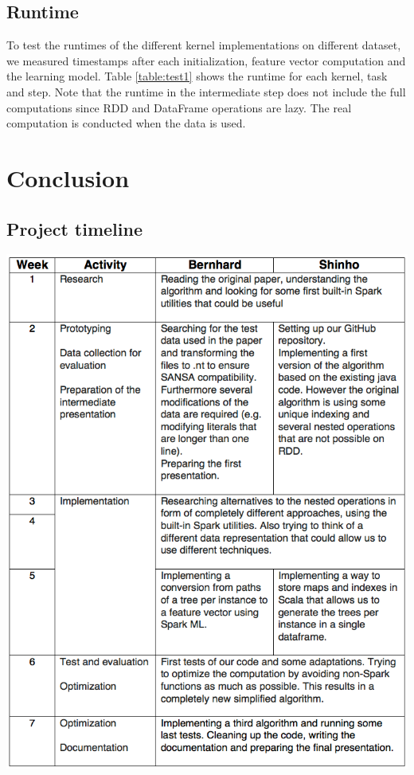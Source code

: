 \documentclass{easychair}
\begin{document}
\subsection{Runtime}
To test the runtimes of the different kernel implementations on different dataset, we measured timestamps after each initialization, feature vector computation and the learning model. Table \ref{table:test1} shows the runtime for each kernel, task and step. Note that the runtime in the intermediate step does not include the full computations since RDD and DataFrame operations are lazy. The real computation is conducted when the data is used.

\section{Conclusion}
\label{sect:Conclusion}

\subsection{Project timeline}
\includegraphics[width=14cm]{Timeline.png}
\end{document}
